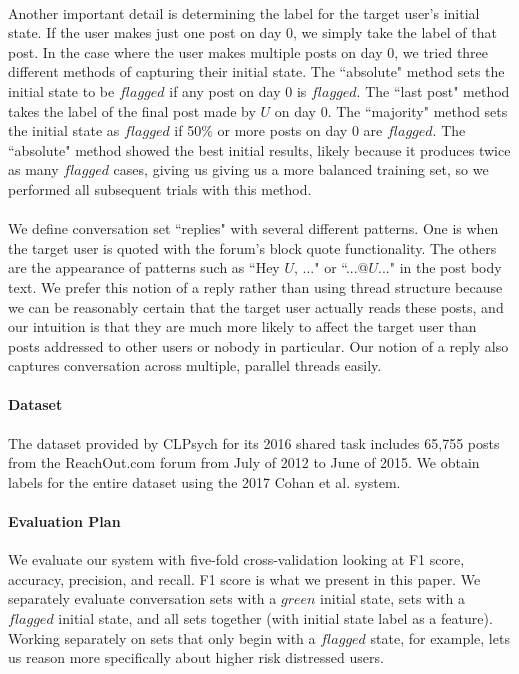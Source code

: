 \documentclass{article}
\begin{document}
\paragraph{}Another important detail is determining the label for the target user's initial state. If the user makes just one post on day 0, we simply take the label of that post. In the case where the user makes multiple posts on day 0, we tried three different methods of capturing their initial state. The ``absolute" method sets the initial state to be $flagged$ if any post on day 0 is $flagged$. The ``last post" method takes the label of the final post made by $U$ on day 0. The ``majority" method sets the initial state as $flagged$ if 50\% or more posts on day 0 are $flagged$. The ``absolute" method showed the best initial results, likely because it produces twice as many $flagged$ cases, giving us giving us a more balanced training set, so we performed all subsequent trials with this method.

\paragraph{}We define conversation set ``replies" with several different patterns. One is when the target user is quoted with the forum's block quote functionality. The others are the appearance of patterns such as ``Hey $U$, ..." or ``...@$U$..." in the post body text. We prefer this notion of a reply rather than using thread structure because we can be reasonably certain that the target user actually reads these posts, and our intuition is that they are much more likely to affect the target user than posts addressed to other users or nobody in particular. Our notion of a reply also captures conversation across multiple, parallel threads easily.

\paragraph{Dataset}The dataset provided by CLPsych for its 2016 shared task includes 65,755 posts from the ReachOut.com forum from July of 2012 to June of 2015. We obtain labels for the entire dataset using the 2017 Cohan et al. system.

\paragraph{Evaluation Plan}We evaluate our system with five-fold cross-validation looking at F1 score, accuracy, precision, and recall. F1 score is what we present in this paper. We separately evaluate conversation sets with a $green$ initial state, sets with a $flagged$ initial state, and all sets together (with initial state label as a feature). Working separately on sets that only begin with a $flagged$ state, for example, lets us reason more specifically about higher risk distressed users.
\end{document}
